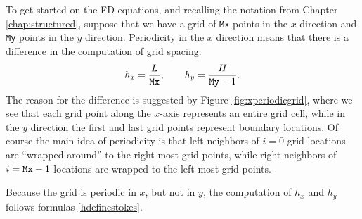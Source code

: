 To get started on the FD equations, and recalling the notation from Chapter \ref{chap:structured}, suppose that we have a grid of \texttt{Mx} points in the $x$ direction and \texttt{My} points in the $y$ direction.  Periodicity in the $x$ direction means that there is a difference in the computation of grid spacing:
\begin{equation}
h_x = \frac{L}{\text{\texttt{Mx}}}, \qquad h_y = \frac{H}{\text{\texttt{My}}-1}. \label{hdefinestokes}
\end{equation}
The reason for the difference is suggested by Figure \ref{fig:xperiodicgrid}, where we see that each grid point along the $x$-axis represents an entire grid cell, while in the $y$ direction the first and last grid points represent boundary locations.  Of course the main idea of periodicity is that left neighbors of $i=0$ grid locations are ``wrapped-around'' to the right-most grid points, while right neighbors of $i=\text{\texttt{Mx}}-1$ locations are wrapped to the left-most grid points.

\begin{marginfigure}
\caption{Because the grid is periodic in $x$, but not in $y$, the computation of $h_x$ and $h_y$ follows formulas \eqref{hdefinestokes}.}
\label{fig:xperiodicgrid}
\end{marginfigure}

